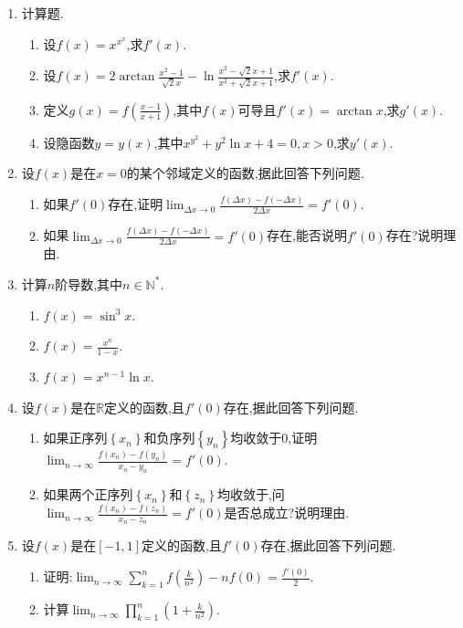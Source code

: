 \documentclass[b5paper,oneside]{ctexart}
\begin{document}
\begin{enumerate}[1.]
    \newpage\item 计算题.
        \begin{enumerate}[(1)]
            \item 设$f(x)=x^{x^x}$,求$f'(x)$.
            \item 设$f(x)=2\arctan{\frac{x^2-1}{\sqrt{2}x}}-\ln{\frac{x^2-\sqrt{2}x+1}{x^2+\sqrt{2}x+1}}$,求$f'(x)$.
            \item 定义$g(x)=f(\frac{x-1}{x+1})$,其中$f(x)$可导且$f'(x)=\arctan{x}$,求$g'(x)$.
            \item 设隐函数$y=y(x)$,其中$x^{y^2}+y^2\ln{x}+4=0,x>0$,求$y'(x)$.
        \end{enumerate}
    \newpage\item 设$f(x)$是在$x=0$的某个邻域定义的函数,据此回答下列问题.
        \begin{enumerate}[(1)]
            \item 如果$f'(0)$存在,证明$\lim_{\Delta x\to 0}{\frac{f(\Delta x)-f(-\Delta x)}{2\Delta x}}=f'(0)$.
            \item 如果$\lim_{\Delta x\to 0}{\frac{f(\Delta x)-f(-\Delta x)}{2\Delta x}}=f'(0)$存在,能否说明$f'(0)$存在?说明理由.
        \end{enumerate}
    \newpage\item 计算$n$阶导数,其中$n \in \mathbb{N}^*$.
        \begin{enumerate}[(1)]
            \item $f(x)=\sin^3{x}$.
            \item $f(x)=\frac{x^n}{1-x}$.
            \item $f(x)=x^{n-1}\ln{x}$.
        \end{enumerate}
    \newpage\item 设$f(x)$是在$\mathbb{R}$定义的函数,且$f'(0)$存在,据此回答下列问题.
        \begin{enumerate}[(1)]
            \item 如果正序列$\left\{x_n\right\}$和负序列$\left\{y_n\right\}$均收敛于$0$,证明$\lim_{n \to\infty}{\frac{f(x_n)-f(y_n)}{x_n-y_n}}=f'(0)$.
            \item 如果两个正序列$\left\{x_n\right\}$和$\left\{z_n\right\}$均收敛于,问$\lim_{n \to\infty}{\frac{f(x_n)-f(z_n)}{x_n-z_n}}=f'(0)$是否总成立?说明理由.
        \end{enumerate}
    \newpage\item 设$f(x)$是在$[-1,1]$定义的函数,且$f'(0)$存在,据此回答下列问题.
        \begin{enumerate}[(1)]
            \item 证明:$\lim_{n\to\infty}{\sum_{k=1}^{n}{f\left(\frac{k}{n^2}\right)-nf(0)}}=\frac{f'(0)}{2}$.
            \item 计算$\lim_{n\to\infty}{\prod_{k=1}^{n}{\left( 1+\frac{k}{n^2}\right)}}$.
        \end{enumerate}
\end{enumerate}
\end{document}
